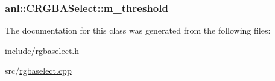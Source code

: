 \label{classanl_1_1CRGBASelect_af4ae5badd45bf21097f2a1ef98ef9edf}
\hypertarget{classanl_1_1CRGBASelect_a0dd0bccc2e375330934c7d2984f99b3b}{
\subsubsection[{m\_\-threshold}]{ {\bf anl::CRGBASelect::m\_\-threshold}}}
\label{classanl_1_1CRGBASelect_a0dd0bccc2e375330934c7d2984f99b3b}


The documentation for this class was generated from the following files:\begin{DoxyCompactItemize}
\item 
include/\hyperlink{rgbaselect_8h}{rgbaselect.h}\item 
src/\hyperlink{rgbaselect_8cpp}{rgbaselect.cpp}\end{DoxyCompactItemize}
